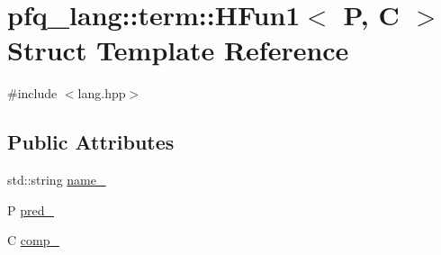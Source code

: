 \hypertarget{structpfq__lang_1_1term_1_1HFun1}{\section{pfq\+\_\+lang\+:\+:term\+:\+:H\+Fun1$<$ P, C $>$ Struct Template Reference}
\label{structpfq__lang_1_1term_1_1HFun1}
}


{\ttfamily \#include $<$lang.\+hpp$>$}

\subsection*{Public Attributes}
\begin{DoxyCompactItemize}
\item 
std\+::string \hyperlink{structpfq__lang_1_1term_1_1HFun1_ac37e99de5e6350b504a03f0e03d725c4}{name\+\_\+}
\item 
P \hyperlink{structpfq__lang_1_1term_1_1HFun1_ac15b6e2665e60ad7f1700797c7677ea6}{pred\+\_\+}
\item 
C \hyperlink{structpfq__lang_1_1term_1_1HFun1_a16b8c06ef73b339272e21dbfd5be962c}{comp\+\_\+}
\end{DoxyCompactItemize}


